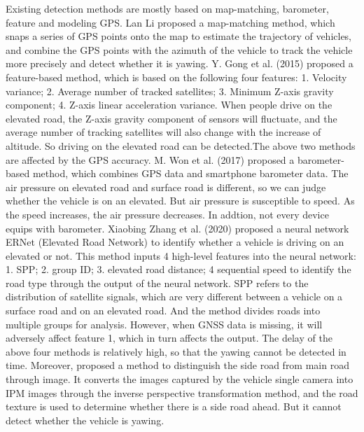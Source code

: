 \documentclass[journal]{IEEEtran}
\begin{document}
Existing detection methods are mostly based on map-matching, barometer, feature and modeling GPS.
Lan Li \cite{li2012azimuth} proposed a map-matching method, which snaps a series of GPS points onto the map to estimate the trajectory of vehicles, and combine the GPS points with the azimuth of the vehicle to track the vehicle more precisely and detect whether it is yawing. Y. Gong et al. (2015) \cite{gong2015deel} proposed a feature-based method, which is based on the following four features: 1. Velocity variance; 2. Average number of tracked satellites; 3. Minimum Z-axis gravity component; 4. Z-axis linear acceleration variance. When people drive on the elevated road, the Z-axis gravity component of sensors will fluctuate, and the average number of tracking satellites will also change with the increase of altitude. So driving on the elevated road can be detected.The above two methods are affected by the GPS accuracy. M. Won et al. (2017) \cite{won2017hybridbaro} proposed a barometer-based method, which combines GPS data and smartphone barometer data. The air pressure on elevated road and surface road is different, so we can judge whether the vehicle is on an elevated. But air pressure is susceptible to speed. As the speed increases, the air pressure decreases. In addtion, not every device equips with barometer. Xiaobing Zhang et al. (2020) \cite{zhang2020elevated} proposed a neural network ERNet (Elevated Road Network) to identify whether a vehicle is driving on an elevated or not. This method inputs 4 high-level features into the neural network: 1. SPP; 2. group ID; 3. elevated road distance; 4 sequential speed to identify the road type through the output of the neural network. SPP refers to the distribution of satellite signals, which are very different between a vehicle on a surface road and on an elevated road. And the method divides roads into multiple groups for analysis. However, when GNSS data is missing, it will adversely affect feature 1, which in turn affects the output. The delay of the above four methods is relatively high, so that the yawing cannot be detected in time.
Moreover, \cite{kikuchi2014occluded} proposed a method to distinguish the side road from main road through image. It converts the images captured by the vehicle single camera into IPM images through the inverse perspective transformation method, and the road texture is used to determine whether there is a side road ahead. But it cannot detect whether the vehicle is yawing.
\end{document}
